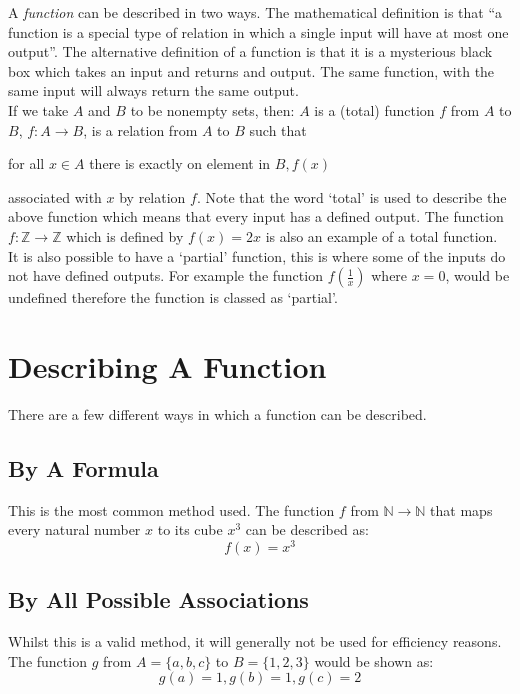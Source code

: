 
A \textit{function} can be described in two ways. The mathematical definition is that ``a function is a special type of relation in which a single input will have at most one output''. The alternative definition of a function is that it is a mysterious black box which takes an input and returns and output. The same function, with the same input will always return the same output.\\

If we take $A$ and $B$ to be nonempty sets, then: $A$ is a (total) function $f$ from $A$ to $B$, $f: A \rightarrow B$, is a relation from $A$ to $B$ such that
\begin{center}
    for all $x \in A$ there is exactly on element in $B, f(x)$
\end{center}
associated with $x$ by relation $f$. Note that the word `total' is used to describe the above function which means that every input has a defined output. The function $f: \mathbb{Z} \rightarrow \mathbb{Z}$ which is defined by $f(x) = 2x$ is also an example of a total function. \\

It is also possible to have a `partial' function, this is where some of the inputs do not have defined outputs. For example the function $f(\frac{1}{x})$ where $x=0$, would be undefined therefore the function is classed as `partial'. 

\section{Describing A Function}
There are a few different ways in which a function can be described.
\subsection{By A Formula}
This is the most common method used. The function $f$ from $\mathbb{N} \rightarrow \mathbb{N}$ that maps every natural number $x$ to its cube $x^3$ can be described as:
\[f(x) = x^3\]
\subsection{By All Possible Associations}
Whilst this is a valid method, it will generally not be used for efficiency reasons. The function $g$ from $A = \{a, b, c\}$ to $B=\{1, 2, 3\}$ would be shown as:
\[g(a) = 1, g(b) = 1, g(c) = 2\]


